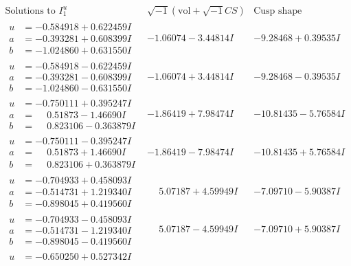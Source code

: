 \documentclass[1p]{elsarticle_modified}
\theoremstyle{definition}
\newcommand{\I}{\sqrt{-1}}
\begin{document}
$$\begin{array}{c|c|c}  
\text{Solutions to }I^u_{1}& \I (\text{vol} + \sqrt{-1}CS) & \text{Cusp shape}\\
 \hline 
\begin{aligned}
u &= -0.584918 + 0.622459 I \\
a &= -0.393281 + 0.608399 I \\
b &= -1.024860 + 0.631550 I\end{aligned}
 & -1.06074 - 3.44814 I & -9.28468 + 0.39535 I \\ \hline\begin{aligned}
u &= -0.584918 - 0.622459 I \\
a &= -0.393281 - 0.608399 I \\
b &= -1.024860 - 0.631550 I\end{aligned}
 & -1.06074 + 3.44814 I & -9.28468 - 0.39535 I \\ \hline\begin{aligned}
u &= -0.750111 + 0.395247 I \\
a &= \phantom{-}0.51873 - 1.46690 I \\
b &= \phantom{-}0.823106 - 0.363879 I\end{aligned}
 & -1.86419 + 7.98474 I & -10.81435 - 5.76584 I \\ \hline\begin{aligned}
u &= -0.750111 - 0.395247 I \\
a &= \phantom{-}0.51873 + 1.46690 I \\
b &= \phantom{-}0.823106 + 0.363879 I\end{aligned}
 & -1.86419 - 7.98474 I & -10.81435 + 5.76584 I \\ \hline\begin{aligned}
u &= -0.704933 + 0.458093 I \\
a &= -0.514731 + 1.219340 I \\
b &= -0.898045 + 0.419560 I\end{aligned}
 & \phantom{-}5.07187 + 4.59949 I & -7.09710 - 5.90387 I \\ \hline\begin{aligned}
u &= -0.704933 - 0.458093 I \\
a &= -0.514731 - 1.219340 I \\
b &= -0.898045 - 0.419560 I\end{aligned}
 & \phantom{-}5.07187 - 4.59949 I & -7.09710 + 5.90387 I \\ \hline\begin{aligned}
u &= -0.650250 + 0.527342 I \\

\end{aligned}
\end{array}$$
\end{document}
